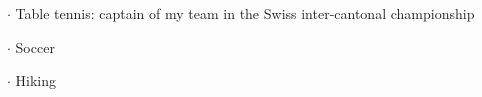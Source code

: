 

\begin{cvskills}


  \cvskill
    {} %
    {$\cdot$ Table tennis: captain of my team in the Swiss inter-cantonal 
     championship} %

  \cvskill
    {}
    {$\cdot$ Soccer}

  \cvskill
    {}
    {$\cdot$ Hiking}

\end{cvskills}
